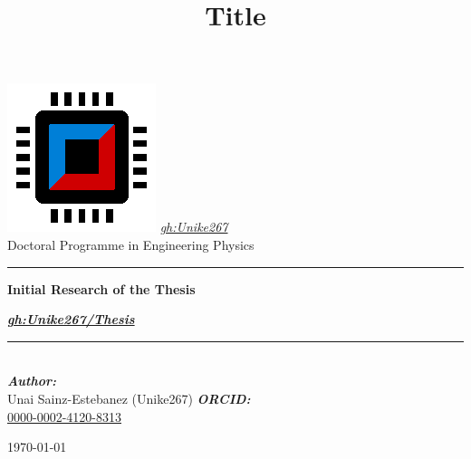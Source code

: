 
\newcommand{\gh}{\href{https://github.com/Unike267}{gh:Unike267}}
\newcommand{\type}{Doctoral Programme in Engineering Physics}
\newcommand{\titulo}{Initial Research of the Thesis} %
\title{Title}
\newcommand{\subtitle}{\textit{\href{https://github.com/Unike267/Thesis}{gh:Unike267/Thesis}}}

\begin{center}\leavevmode
    \normalfont
    \includegraphics[width=0.35\columnwidth]{figures/logo.png}
    \vskip 10mm 
    \textit{\Large \gh}\\[1 cm]
    {\large \type}
    \vskip 5mm
    \rule{\linewidth}{0.2 mm}
    {\huge \bfseries \titulo \par}
    \vskip 5mm
    {\Large \bfseries \subtitle \par}
    \rule{\linewidth}{0.2 mm}\\[1.5 cm]
    \large
	\emph{\textbf{Author:}}\\
    Unai Sainz-Estebanez (Unike267)
    \vskip 5mm
	\emph{\textbf{ORCID:}}\\
    \href{https://orcid.org/0000-0002-4120-8313}{0000-0002-4120-8313}
    \vfill
    {\normalsize \today \par}
\end{center}
\cleardoublepage
